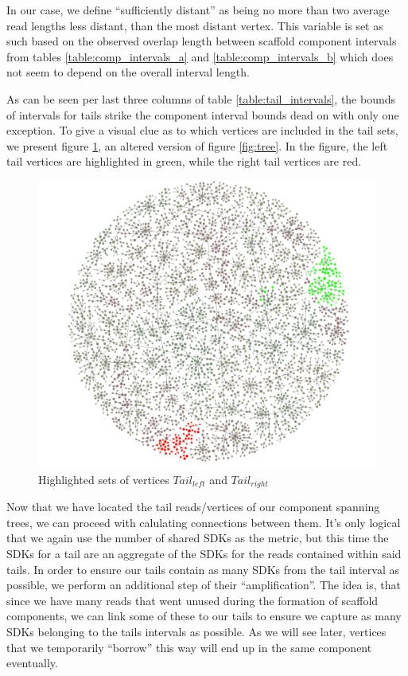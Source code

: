 In our case, we define “sufficiently distant” as being no more than two average read lengths less distant, than the most distant vertex. This variable is set as such based on the observed overlap length between scaffold component intervals from tables \ref{table:comp_intervals_a} and \ref{table:comp_intervals_b} which does not seem to depend on the overall interval length.

As can be seen per last three columns of table \ref{table:tail_intervals}, the bounds of intervals for tails strike the component interval bounds dead on with only one exception. 
To give a visual clue as to which vertices are included in the tail sets, we present figure \ref{fig:tails}, an altered version of figure \ref{fig:tree}. In the figure, the left tail vertices are highlighted in green, while the right tail vertices are red.

\begin{figure}
\includegraphics[width=450bp]{figures/tails.png}
\caption{Highlighted sets of vertices $Tail_{left}$ and $Tail_{right}$}
\label{fig:tails}
\end{figure}

Now that we have located the tail reads/vertices of our component spanning trees, we can proceed with calulating connections between them. It's only logical that we again use the number of shared SDKs as the metric, but this time the SDKs for a tail are an aggregate of the SDKs for the reads contained within said tails.
In order to ensure our tails contain as many SDKs from the tail interval as possible, we perform an additional step of their “amplification”. The idea is, that since we have many reads that went unused during the formation of scaffold components, we can link some of these to our tails to ensure we capture as many SDKs belonging to the tails intervals as possible. As we will see later, vertices that we temporarily “borrow” this way will end up in the same component eventually.

